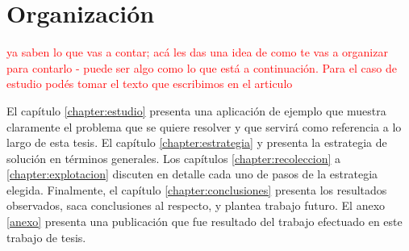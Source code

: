 \section{Organización}
\label{section:organizacion}

\begin{framed}
\textcolor{red}{ya saben lo que vas a contar; acá les das una idea de como te vas a organizar para contarlo - puede ser algo como lo que está a continuación. Para el caso de estudio podés tomar el texto que escribimos en el articulo}
\end{framed}

El capítulo \ref{chapter:estudio} presenta una aplicación de ejemplo que muestra claramente el problema que se quiere resolver y que servirá como referencia a lo largo de esta tesis. El capítulo \ref{chapter:estrategia} y presenta la estrategia de solución en términos generales. Los capítulos \ref{chapter:recoleccion} a \ref{chapter:explotacion} discuten en detalle cada uno de pasos de la estrategia elegida. Finalmente, el capítulo \ref{chapter:conclusiones} presenta los resultados observados, saca conclusiones al respecto, y plantea trabajo futuro. El anexo \ref{anexo} presenta una publicación que fue resultado del trabajo efectuado en este trabajo de tesis. 




